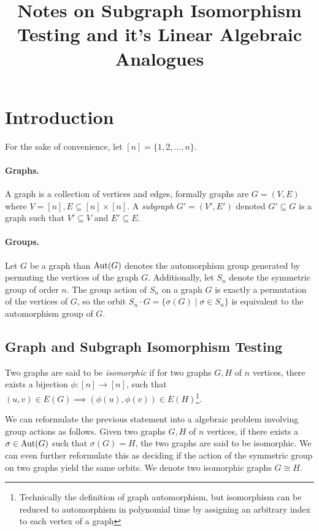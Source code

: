 \message{ !name(subgraph_iso_note.tex)}\documentclass[12pt]{article}
\title{
    Notes on Subgraph Isomorphism Testing and it's Linear Algebraic Analogues
}
\author{}
\date{}
\begin{document}


\maketitle

\section{Introduction}

For the sake of convenience, let $[n] = \{ 1, 2, \ldots, n \}$.

\paragraph{Graphs.} A graph is a collection of vertices and edges, formally graphs are $G=(V, E)$ where $V=[n],E\subseteq [n]{\times}[n]$. A \textit{subgraph} $G'=(V',E')$ denoted $G'\subseteq G$ is a graph such that $V' \subseteq V$ and $E'\subseteq E$.

\paragraph{Groups.} Let $G$ be a graph than $\mathrm{Aut}(G)$ denotes the automorphism group generated by permuting the vertices of the graph $G$. Additionally, let $S_{n}$ denote the symmetric group of order $n$. The group action of $S_{n}$ on a graph $G$ is exactly a permutation of the vertices of $G$, so the orbit $S_{n}\cdot G = \{ \sigma(G) \mid \sigma \in S_{n} \}$ is equivalent to the automorphism group of $G$.

\subsection{Graph and Subgraph Isomorphism Testing}

Two graphs are said to be \textit{isomorphic} if for two graphs $G, H$ of $n$ vertices, there exists a bijection $\phi : [n] \to [n]$, such that $(u,v)\in E(G) \implies (\phi(u),\phi(v)) \in E(H)$\footnote{Technically the definition of graph automorphism, but isomorphism can be reduced to automorphism in polynomial time by assigning an arbitrary index to each vertex of a graph}.

We can reformulate the previous statement into a algebraic problem involving group actions as follows. Given two graphs $G,H$ of $n$ vertices, if there exists a $\sigma\in \mathrm{Aut}(G)$ such that $\sigma(G)=H$, the two graphs are said to be isomorphic. We can even further reformulate this as deciding if the action of the symmetric group on two graphs yield the same orbits. We denote two isomorphic graphs $G\cong H$.
\end{document}
